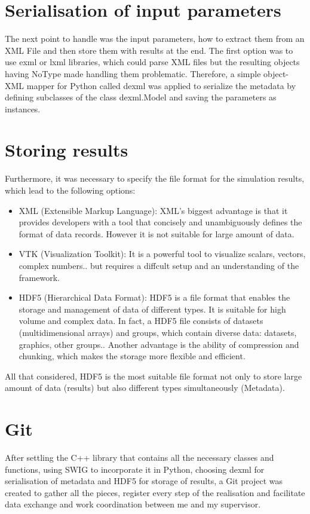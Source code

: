 \section{Serialisation of input parameters}
The next point to handle was the input parameters, how to extract them from an XML File and then store them with results at the end. The first option was to use exml or lxml libraries, which could parse XML files but the resulting objects having NoType made handling them problematic. Therefore, a simple object-XML mapper for Python called dexml was applied to serialize the metadata by defining subclasses of the class dexml.Model and saving the parameters as instances.\\
\section{Storing results}
Furthermore, it was necessary to specify the file format for the simulation results, which lead to the following options:\\
\begin{itemize}
\item XML (Extensible Markup Language): XML's biggest advantage is that it provides developers with a tool that concisely and unambiguously defines the format of data records. However it is not suitable for large amount of data.\\
\item VTK (Visualization Toolkit): It is a powerful tool to visualize scalars, vectors, complex numbers.. but  requires a diffcult setup and an understanding of the framework.\\ 
\item HDF5 (Hierarchical Data Format): HDF5 is a file format that enables the storage and management of data of different types. It is suitable for high volume and complex data. In fact, a HDF5 file consists of datasets (multidimensional arrays) and groups, which contain diverse data: datasets, graphics, other groups.. Another advantage is the ability of compression and chunking, which makes the storage more flexible and efficient.\\ 
\end{itemize}
All that considered, HDF5 is the most suitable file format not only to store large amount of data (results) but also different types simultaneously (Metadata).
\section{Git}
After settling the C++ library that contains all the necessary classes and functions, using SWIG to incorporate it in Python, choosing dexml for serialisation of metadata and HDF5 for storage of results, a Git project was created to gather all the pieces, register every step of the realisation and facilitate data exchange and work coordination between me and my supervisor. \\

